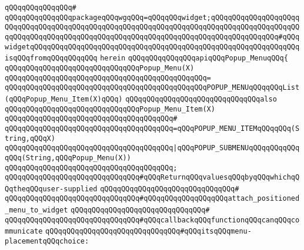 \verb|qQQqqQQqqQQqqQQq#|\newline
\verb|qQQqqQQqqQQqqQQqpackageqQQqwgqQQq=qQQqqQQqwidget;qQQqqQQqqQQqqQQqqQQqqQQqqQQqqQQqqQQqqQQqqQQqqQQqqQQqqQQqqQQqqQQqqQQqqQQqqQQqqQQqqQQqqQQqqQQqqQQqqQQqqQQqqQQqqQQqqQQqqQQqqQQqqQQqqQQqqQQqqQQqqQQqqQQqqQQqqQQq#qQQqwidgetqQQqqQQqqQQqqQQqqQQqqQQqqQQqqQQqqQQqqQQqqQQqqQQqqQQqqQQqqQQqqQQqisqQQqfromqQQqqQQqqQQq|\newline
\verb|herein|\newline
\newline
\verb|qQQqqQQqqQQqqQQqapiqQQqPopup_MenuqQQq{|\newline
\newline
\verb|qQQqqQQqqQQqqQQqqQQqqQQqqQQqqQQqPopup_Menu(X)|\newline
\verb|qQQqqQQqqQQqqQQqqQQqqQQqqQQqqQQqqQQqqQQqqQQqqQQq=|\newline
\verb|qQQqqQQqqQQqqQQqqQQqqQQqqQQqqQQqqQQqqQQqqQQqqQQqPOPUP_MENUqQQqqQQqList(qQQqPopup_Menu_Item(X)qQQq)|\newline
\newline
\verb|qQQqqQQqqQQqqQQqqQQqqQQqqQQqqQQqalso|\newline
\verb|qQQqqQQqqQQqqQQqqQQqqQQqqQQqqQQqPopup_Menu_Item(X)|\newline
\verb|qQQqqQQqqQQqqQQqqQQqqQQqqQQqqQQqqQQqqQQq#|\newline
\verb|qQQqqQQqqQQqqQQqqQQqqQQqqQQqqQQqqQQqqQQq=qQQqPOPUP_MENU_ITEMqQQqqQQq(String,qQQqX)|\newline
\verb|qQQqqQQqqQQqqQQqqQQqqQQqqQQqqQQqqQQqqQQq|\verb#|qQQqPOPUP_SUBMENUqQQqqQQqqQQqqQQq(String,qQQqPopup_Menu(X))#\newline
\verb|qQQqqQQqqQQqqQQqqQQqqQQqqQQqqQQqqQQqqQQq;|\newline
\newline
\verb|qQQqqQQqqQQqqQQqqQQqqQQqqQQqqQQq#qQQqReturnqQQqvaluesqQQqbyqQQqwhichqQQqtheqQQquser-supplied|\newline
\verb|qQQqqQQqqQQqqQQqqQQqqQQqqQQqqQQq#|\newline
\verb|qQQqqQQqqQQqqQQqqQQqqQQqqQQqqQQq#qQQqqQQqqQQqqQQqqQQqattach_positioned_menu_to_widget|\newline
\verb|qQQqqQQqqQQqqQQqqQQqqQQqqQQqqQQq#|\newline
\verb|qQQqqQQqqQQqqQQqqQQqqQQqqQQqqQQq#qQQqcallbackqQQqfunctionqQQqcanqQQqcommunicate|\newline
\verb|qQQqqQQqqQQqqQQqqQQqqQQqqQQqqQQq#qQQqitsqQQqmenu-placementqQQqchoice:|\newline
